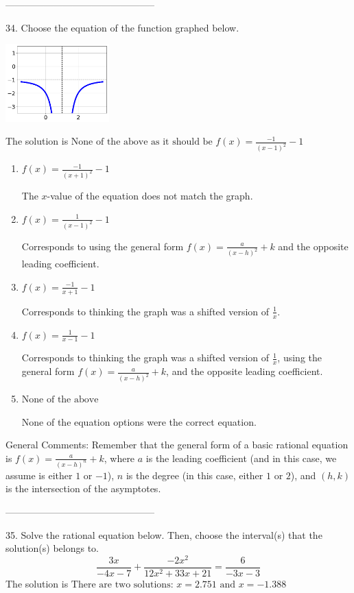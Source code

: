 \documentclass{article}[14pt]
\begin{document}
-----------------------------------------------

34. Choose the equation of the function graphed below.
\begin{center} \includegraphics[width=0.3\textwidth]{../Figures/rationalGraphToEquationB.png} \end{center} 

The solution is $ \text{None of the above as it should be } f(x) = \frac{-1}{(x - 1)^2} - 1 $ 

\begin{enumerate}[label=\Alph*.] 
\item $ f(x) = \frac{-1}{(x + 1)^2} - 1 $ 

 The $x$-value of the equation does not match the graph. 
\item $ f(x) = \frac{1}{(x - 1)^2} - 1 $ 

 Corresponds to using the general form $f(x) = \frac{a}{(x-h)^2}+k$ and the opposite leading coefficient. 
\item $ f(x) = \frac{-1}{x + 1} - 1 $ 

 Corresponds to thinking the graph was a shifted version of $\frac{1}{x}$. 
\item $ f(x) = \frac{1}{x - 1} - 1 $ 

 Corresponds to thinking the graph was a shifted version of $\frac{1}{x}$, using the general form $f(x) = \frac{a}{(x-h)^2}+k$, and the opposite leading coefficient. 
\item $ \text{None of the above} $ 

 None of the equation options were the correct equation. 
\end{enumerate} 
 
General Comments: Remember that the general form of a basic rational equation is $ f(x) = \frac{a}{(x-h)^n} + k$, where $a$ is the leading coefficient (and in this case, we assume is either $1$ or $-1$), $n$ is the degree (in this case, either $1$ or $2$), and $(h, k)$ is the intersection of the asymptotes.

-----------------------------------------------

35. Solve the rational equation below. Then, choose the interval(s) that the solution(s) belongs to.
$$ \frac{3x}{-4x -7} + \frac{-2x^{2}}{12x^{2} +33 x + 21} = \frac{6}{-3x -3} $$ 
The solution is $ \text{There are two solutions: } x = 2.751 \text{ and } x = -1.388 $ 
\end{document}
